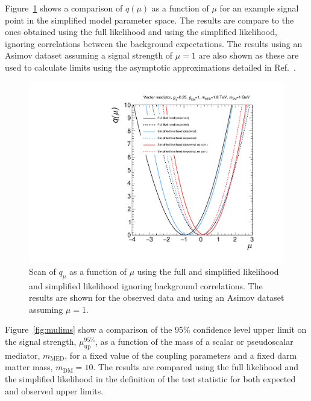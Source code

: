 Figure~\ref{fig:lhscan-mj} shows a comparison of $q(\mu)$ as a function of $\mu$ for an example signal point in the simplified model parameter space. 
The results are compare to the ones obtained using 
the full likelihood and using the simplified likelihood, ignoring correlations between the background expectations. The results using an Asimov dataset assuming a signal 
strength of $\mu=1$ are also shown as these are used to calculate limits using the asymptotic approximations detailed in Ref.~\cite{Cowan:2010js}. 


\begin{figure}[hbt!]
  \begin{center} 
   \includegraphics[width=1.5\cmsFigWidth]{figures/compare_mj_likelihoods.pdf}
   \caption{Scan of $q_{\mu}$ as a function of $\mu$ using the full and simplified likelihood and simplified likelihood ignoring background correlations. 
   The results are shown for the observed data and using an Asimov dataset assuming $\mu=1$.}
   \label{fig:lhscan-mj} 
  \end{center}
\end{figure}


Figure~\ref{fig:mulims} show a comparison of the 95\% confidence level upper limit on the signal strength, $\mu_{\mathrm{up}}^{95\%}$, as a function of 
the mass of a scalar or pseudoscalar mediator, $m_{\mathrm{MED}}$, for a fixed value of the coupling parameters and a fixed darm matter mass, $m_{\mathrm{DM}}=10$\GeV. 
The results are compared using the full likelihood and the simplified likelihood in the definition of the test statistic for both expected and observed upper limits. 


